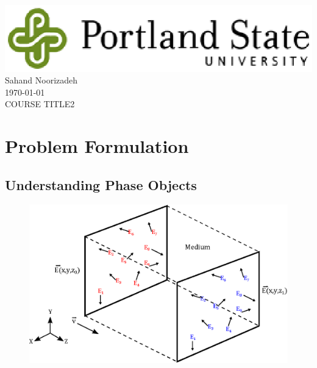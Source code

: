 




\begin{titlepage}
\begin{center}

\setlength{\topskip}{3cm}
\center{\huge{\textsc{ -\\ }}}
\vspace{10 cm}
\includegraphics[scale=0.75, origin=c]{figures/PSU-logo.eps} \\
\vspace{0.75 cm} 
\large{Sahand Noorizadeh } \\
\vspace{0.25 cm} 
\large \today \\
\vspace{1.5 cm}
COURSE TITLE2
\end{center}
\end{titlepage}

\section{Problem Formulation}
\subsection{Understanding Phase Objects}

\begin{figure}[h]
	\centering
	\includegraphics[scale=1]{figures/field_prop.eps}
\end{figure}

